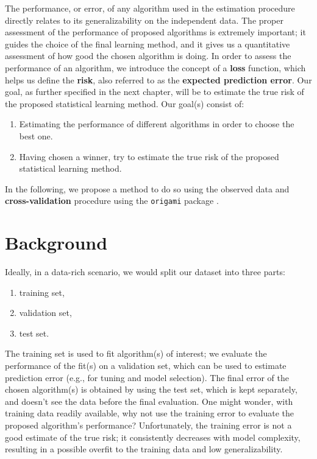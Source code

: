 \documentclass[12pt, krantz2,]{book}
\providecommand{\tightlist}{%
  \setlength{\itemsep}{0pt}\setlength{\parskip}{0pt}}
\theoremstyle{definition}
\theoremstyle{definition}
\theoremstyle{definition}
\newcommand{\1}{\mathbbm{1}}
\begin{document}
The performance, or error, of any algorithm used in the estimation procedure
directly relates to its generalizability on the independent data. The proper
assessment of the performance of proposed algorithms is extremely important; it
guides the choice of the final learning method, and it gives us a quantitative
assessment of how good the chosen algorithm is doing. In order to assess the
performance of an algorithm, we introduce the concept of a \textbf{loss} function,
which helps us define the \textbf{risk}, also referred to as the \textbf{expected
prediction error}. Our goal, as further specified in the next chapter, will be
to estimate the true risk of the proposed statistical learning method. Our
goal(s) consist of:

\begin{enumerate}
\def\labelenumi{\arabic{enumi}.}
\tightlist
\item
  Estimating the performance of different algorithms in order to choose the
  best one.
\item
  Having chosen a winner, try to estimate the true risk of the proposed
  statistical learning method.
\end{enumerate}

In the following, we propose a method to do so using the observed data and
\textbf{cross-validation} procedure using the \texttt{origami} package \citep{coyle2018origami}.

\hypertarget{background}{%
\section{Background}\label{background}}

Ideally, in a data-rich scenario, we would split our dataset into three parts:

\begin{enumerate}
\def\labelenumi{\arabic{enumi}.}
\tightlist
\item
  training set,
\item
  validation set,
\item
  test set.
\end{enumerate}

The training set is used to fit algorithm(s) of interest; we evaluate the
performance of the fit(s) on a validation set, which can be used to estimate
prediction error (e.g., for tuning and model selection). The final error of the
chosen algorithm(s) is obtained by using the test set, which is kept separately,
and doesn't see the data before the final evaluation. One might wonder, with
training data readily available, why not use the training error to evaluate the
proposed algorithm's performance? Unfortunately, the training error is not a
good estimate of the true risk; it consistently decreases with model complexity,
resulting in a possible overfit to the training data and low generalizability.
\end{document}

